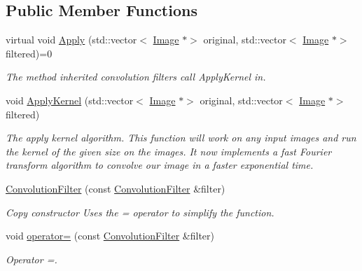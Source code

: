 \subsection*{Public Member Functions}
\begin{DoxyCompactItemize}
\item 
\mbox{\label{classConvolutionFilter_a55f8a3bbe4c93bf849b7eecd1531e8a7}} 
virtual void \hyperlink{classConvolutionFilter_a55f8a3bbe4c93bf849b7eecd1531e8a7}{Apply} (std\+::vector$<$ \hyperlink{classImage}{Image} $\ast$$>$ original, std\+::vector$<$ \hyperlink{classImage}{Image} $\ast$$>$ filtered)=0
\begin{DoxyCompactList}\small\item\em The method inherited convolution filters call Apply\+Kernel in. \end{DoxyCompactList}\item 
\mbox{\label{classConvolutionFilter_af37f2a6e6c7e9f95cf769494a5227b0d}} 
void \hyperlink{classConvolutionFilter_af37f2a6e6c7e9f95cf769494a5227b0d}{Apply\+Kernel} (std\+::vector$<$ \hyperlink{classImage}{Image} $\ast$$>$ original, std\+::vector$<$ \hyperlink{classImage}{Image} $\ast$$>$ filtered)
\begin{DoxyCompactList}\small\item\em The apply kernel algorithm. This function will work on any input images and run the kernel of the given size on the images. It now implements a fast Fourier transform algorithm to convolve our image in a faster exponential time. \end{DoxyCompactList}\item 
\mbox{\label{classConvolutionFilter_a2750951441b1fceb7006192396a706ed}} 
\hyperlink{classConvolutionFilter_a2750951441b1fceb7006192396a706ed}{Convolution\+Filter} (const \hyperlink{classConvolutionFilter}{Convolution\+Filter} \&filter)
\begin{DoxyCompactList}\small\item\em Copy constructor Uses the = operator to simplify the function. \end{DoxyCompactList}\item 
\mbox{\label{classConvolutionFilter_a8430a9858e927d8c8cdc5e0b500d1b40}} 
void \hyperlink{classConvolutionFilter_a8430a9858e927d8c8cdc5e0b500d1b40}{operator=} (const \hyperlink{classConvolutionFilter}{Convolution\+Filter} \&filter)
\begin{DoxyCompactList}\small\item\em Operator =. \end{DoxyCompactList}\end{DoxyCompactItemize}
